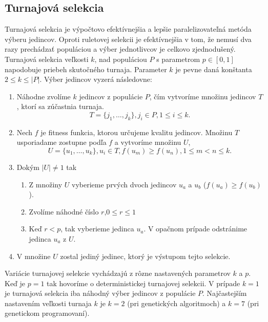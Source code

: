 \subsection{Turnajová selekcia}\label{kap2:2.4:2.4.2:Tournament}
Turnajová selekcia je výpočtovo efektívnejšia a lepšie paralelizovateľná metóda výberu jedincov. Oproti ruletovej selekcii je efektívnejšia v tom, že nemusí dva razy prechádzať populáciou a výber jednotlivcov je celkovo zjednodušený. Turnajová selekcia veľkosti $k$, nad populáciou $P$ s parametrom $p \in [0,1]$ napodobuje priebeh skutočného turnaja. Parameter $k$ je pevne daná konštanta $2 \leq k \leq \lvert P \lvert$. Výber jedincov vyzerá následovne:
\begin{enumerate}
\item Náhodne zvolíme $k$ jedincov z populácie $P$, čím vytvoríme množinu jedincov $T$, ktorí sa zúčastnia turnaja.
\begin{equation}
T = \{j_1,\ldots,j_k\}, j_i \in P, 1 \leq i \leq k.\nonumber
\end{equation}
\item Nech $f$ je fitness funkcia, ktorou určujeme kvalitu jedincov. Množinu $T$ usporiadame zostupne podľa $f$ a vytvoríme množinu $U$,
\begin{equation}
U = \{u_1,\ldots,u_k\}, u_i \in T, f(u_m) \geq f(u_n), 1 \leq m < n \leq k.\nonumber
\end{equation}
\item Dokým $\lvert U \rvert \ne 1$ tak
\begin{enumerate}
\item Z množiny $U$ vyberieme prvých dvoch jedincov $u_a$ a $u_b$ ($f(u_a) \geq f(u_b)$).
\item Zvolíme náhodné číslo $r$,$0 \leq r \leq 1$
\item  Keď $r < p$, tak vyberieme jedinca $u_a$. V opačnom prípade odstránime jedinca $u_a$ z $U$.
\end{enumerate}
\item V množine $U$ zostal jediný jedinec, ktorý je výstupom tejto selekcie.
\end{enumerate}

Variácie turnajovej selekcie vychádzajú z rôzne nastavených parametrov $k$ a $p$. Keď je $p=1$ tak hovoríme o deterministickej turnajovej selekcii. V prípade $k=1$ je turnajová selekcia iba náhodný výber jedincov z populácie $P$. Najčastejším nastavením veľkosti turnaja $k$ je $k=2$ (pri genetických algoritmoch) a $k=7$ (pri genetickom programovaní).
 
